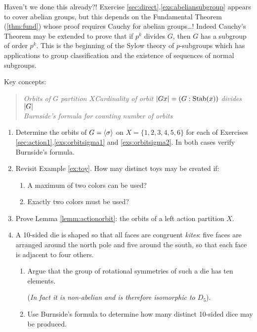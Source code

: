 Haven't we done this already?! Exercise \ref*{sec:direct}.\ref{exs:abeliansubgroup} appears to cover abelian groups, but this depends on the Fundamental Theorem (\ref{thm:fund}) whose proof requires Cauchy for abelian groups\ldots! Indeed Cauchy's Theorem may be extended to prove that if $p^k$ divides $G$, then $G$ has a subgroup of order $p^k$. This is the beginning of the Sylow theory of $p$-subgroups which has applications to group classification and the existence of sequences of normal subgroups. 


\goodbreak

\begin{exercises}{}{}
	Key concepts:
	\begin{quote}
		\emph{Orbits of $G$ partition $X$\qquad Cardinality of orbit $\left| Gx\right|=(G:\operatorname{Stab}(x))$ divides $\left| G\right|$\\
	Burnside's formula for counting number of orbits}
	\end{quote}
	
	\begin{enumerate}
	  \item Determine the orbits of $G=\left\langle \sigma\right\rangle$ on $X=\{1,2,3,4,5,6\}$ for each of Exercises \ref*{sec:action1}.\ref{exs:orbitsigma1} and \ref{exs:orbitsigma2}. In both cases verify Burnside's formula.
	  
	  
		\item Revisit Example \ref{ex:toy}. How may distinct toys may be created if:
		\begin{enumerate}
		  \item A maximum of two colors can be used?
		  \item Exactly two colors must be used?
		\end{enumerate}
		
	  
	  \item Prove Lemma \ref{lemm:actionorbit}: the orbits of a left action partition $X$.
	  
		
		\item A 10-sided die is shaped so that all faces are congruent \emph{kites}: five faces are arranged around the north pole and five around the south, so that each face is adjacent to four others.
		\begin{enumerate}
		  \item Argue that the group of rotational symmetries of such a die has ten elements.\par
		  (\emph{In fact it is non-abelian and is therefore isomorphic to $D_5$}).
		  \item Use Burnside's formula to determine how many distinct 10-sided dice may be produced.
		\end{enumerate}
		

\end{enumerate}
\end{exercises}
